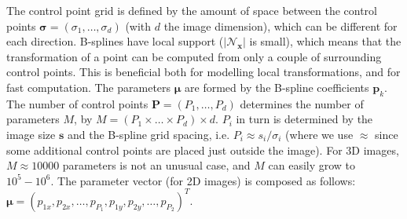 \documentclass[]{report}
\newcommand{\vx}{\bm{x}}
\newcommand{\vmu}{\bm{\mu}}
\newcommand{\Ncal}{\mathcal{N}}
\begin{document}
\begin{description}
The control point grid is defined by the amount of space between the
control points $\bm{\sigma} = (\sigma_1, \ldots, \sigma_d)$ (with
$d$ the image dimension), which can be different for each direction.
B-splines have local support ($|\Ncal_{\vx}|$ is small), which means
that the transformation of a point can be computed from only a
couple of surrounding control points. This is beneficial both for
modelling local transformations, and for fast computation. The
parameters $\vmu$ are formed by the B-spline coefficients
$\bm{p}_k$. The number of control points $\bm{P} = (P_1, \ldots,
P_d)$ determines the number of parameters $M$, by $M = ( P_1 \times
\ldots \times P_d ) \times d$. $P_i$ in turn is determined by the
image size $\bm{s}$ and the B-spline grid spacing, i.e. $P_i \approx
s_i / \sigma_i$ (where we use $\approx$ since some additional
control points are placed just outside the image). For 3D images, $M
\approx 10000$ parameters is not an unusual case, and $M$ can easily
grow to $10^5 - 10^6$. The parameter vector (for 2D images) is
composed as follows: $\vmu = (p_{1x}, p_{2x}, \ldots, p_{P_1},
p_{1y}, p_{2y}, \ldots, p_{P_2} )^T$.


\end{description}
\end{document}
